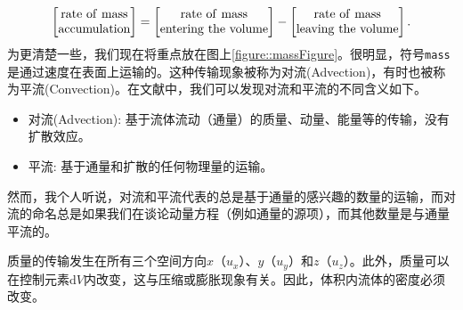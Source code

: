 \documentclass[LBMDerivation.tex]{subfiles}
\begin{document}
%
%
\begin{equation}
\left[
 \begin{matrix}
  \mathrm{rate~of~mass}\\
  \mathrm{accumulation}
 \end{matrix}
\right]
=
\left[
 \begin{matrix}
  \mathrm{rate~of~mass}\\
  \mathrm{entering~the~volume}
 \end{matrix}
\right]
-
\left[
 \begin{matrix}
  \mathrm{rate~of~mass}\\
  \mathrm{leaving~the~volume}
 \end{matrix}
\right].
\label{equation::massWord}
\end{equation}
%
%
	为更清楚一些，我们现在将重点放在图上\ref{figure::massFigure}。很明显，符号{\texttt{mass}}是通过速度在表面上运输的。这种传输现象被称为对流(Advection)，有时也被称为平流(Convection)。在文献中，我们可以发现对流和平流的不同含义如下。
%
%
\begin{itemize}
 \item 对流(Advection): 基于流体流动（通量）的质量、动量、能量等的传输，没有扩散效应。
  \item 平流: 基于通量和扩散的任何物理量的运输。
\end{itemize}
%
%
    然而，我个人听说，对流和平流代表的总是基于通量的感兴趣的数量的运输，而对流的命名总是如果我们在谈论动量方程（例如通量的源项），而其他数量是与通量平流的。


	质量的传输发生在所有三个空间方向$x$（$u_x$）、$y$（$u_y$）和$z$（$u_z$）。此外，质量可以在控制元素d$V$内改变，这与压缩或膨胀现象有关。因此，体积内流体的密度必须改变。
\end{document}
